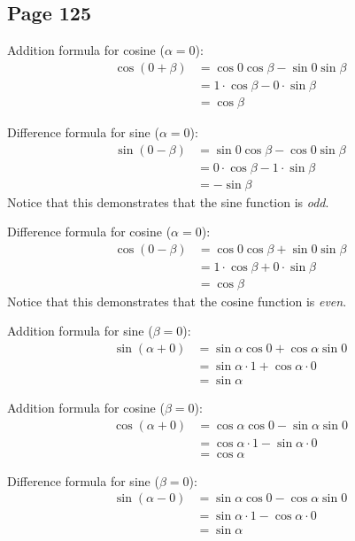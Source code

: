 \documentclass{article}
\newenvironment{solutions}[1]
{\subsection*{#1}
 \begin{enumerate}[leftmargin=1.5em]}
{\end{enumerate}}
\begin{document}
\begin{solutions}{Page 125}
Addition formula for cosine ($\alpha = 0$):
\begin{align*}
\cos\left(0 + \beta\right) 
&= \cos{0}\cos{\beta} - \sin{0}\sin{\beta} \\
&= 1 \cdot \cos{\beta} - 0 \cdot \sin{\beta} \\
&= \cos{\beta}
\end{align*}

Difference formula for sine ($\alpha = 0$):
\begin{align*}
\sin\left(0 - \beta\right) 
&= \sin{0}\cos{\beta} - \cos{0}\sin{\beta} \\
&= 0 \cdot \cos{\beta} - 1 \cdot \sin{\beta} \\
&= -\sin{\beta}
\end{align*}
\quad Notice that this demonstrates that the sine function is \textit{odd}.

Difference formula for cosine ($\alpha = 0$):
\begin{align*}
\cos\left(0 - \beta\right) 
&= \cos{0}\cos{\beta} + \sin{0}\sin{\beta} \\
&= 1 \cdot \cos{\beta} + 0 \cdot \sin{\beta} \\
&= \cos{\beta}
\end{align*}
\quad Notice that this demonstrates that the cosine function is \textit{even}.

Addition formula for sine ($\beta = 0$):
\begin{align*}
\sin\left(\alpha + 0\right) 
&= \sin{\alpha}\cos{0} + \cos{\alpha}\sin{0} \\
&= \sin{\alpha} \cdot 1 + \cos{\alpha} \cdot 0 \\
&= \sin{\alpha}
\end{align*}

Addition formula for cosine ($\beta = 0$):
\begin{align*}
\cos\left(\alpha + 0\right) 
&= \cos{\alpha}\cos{0} - \sin{\alpha}\sin{0} \\
&= \cos{\alpha} \cdot 1 - \sin{\alpha} \cdot 0 \\
&= \cos{\alpha}
\end{align*}

Difference formula for sine ($\beta = 0$):
\begin{align*}
\sin\left(\alpha - 0\right) 
&= \sin{\alpha}\cos{0} - \cos{\alpha}\sin{0} \\
&= \sin{\alpha} \cdot 1 - \cos{\alpha} \cdot 0 \\
&= \sin{\alpha}
\end{align*}


\end{solutions}
\end{document}
